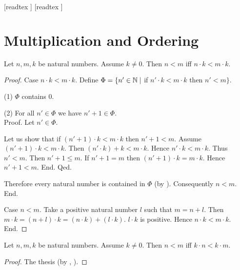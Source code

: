 \documentclass[10pt]{article}
\begin{document}
  \begin{imports}
    \begin{forthel}
      [readtex ]
      [readtex ]
    \end{forthel}
  \end{imports}


  \section*{Multiplication and Ordering}

  \begin{forthel}
    \begin{proposition}
      Let $n, m, k$ be natural numbers.
      Assume $k \neq 0$.
      Then $n < m$ iff $n \cdot k < m \cdot k$.
    \end{proposition}
    \begin{proof}
      Case $n \cdot k < m \cdot k$.
        Define $\Phi = \{ n' \in \mathbb{N} \mid$ if $n' \cdot k < m \cdot k$ then $n' < m \}$.

        (1) $\Phi$ contains $0$.

        (2) For all $n' \in \Phi$ we have $n' + 1 \in \Phi$. \\
        Proof.
          Let $n' \in \Phi$.

          Let us show that if $(n' + 1) \cdot k < m \cdot k$ then $n' + 1 < m$.
            Assume $(n' + 1) \cdot k < m \cdot k$.
            Then $(n' \cdot k) + k < m \cdot k$.
            Hence $n' \cdot k < m \cdot k$.
            Thus $n' < m$.
            Then $n' + 1 \leq m$.
            If $n' + 1 = m$ then $(n' + 1) \cdot k = m \cdot k$.
            Hence $n' + 1 < m$.
          End.
        Qed.

        Therefore every natural number is contained in $\Phi$ (by ).
        Consequently $n < m$.
      End.

      Case $n < m$.
        Take a positive natural number $l$ such that $m = n + l$.
        Then $m \cdot k = (n + l) \cdot k = (n \cdot k) + (l \cdot k)$.
        $l \cdot k$ is positive.
        Hence $n \cdot k < m \cdot k$.
      End.
    \end{proof}
  \end{forthel}

  \begin{forthel}
    \begin{corollary}
      Let $n, m, k$ be natural numbers.
      Assume $k \neq 0$.
      Then $n < m$ iff $k \cdot n < k \cdot m$.
    \end{corollary}
    \begin{proof}
      The thesis (by , ).
    \end{proof}
  \end{forthel}
\end{document}
